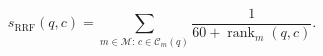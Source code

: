 \[
s_{\mathrm{RRF}}(q,c)=\sum_{m\in\mathcal{M}:\,c\in\mathcal{C}_m(q)}\frac{1}{60+\operatorname{rank}_m(q,c)}.
\]
